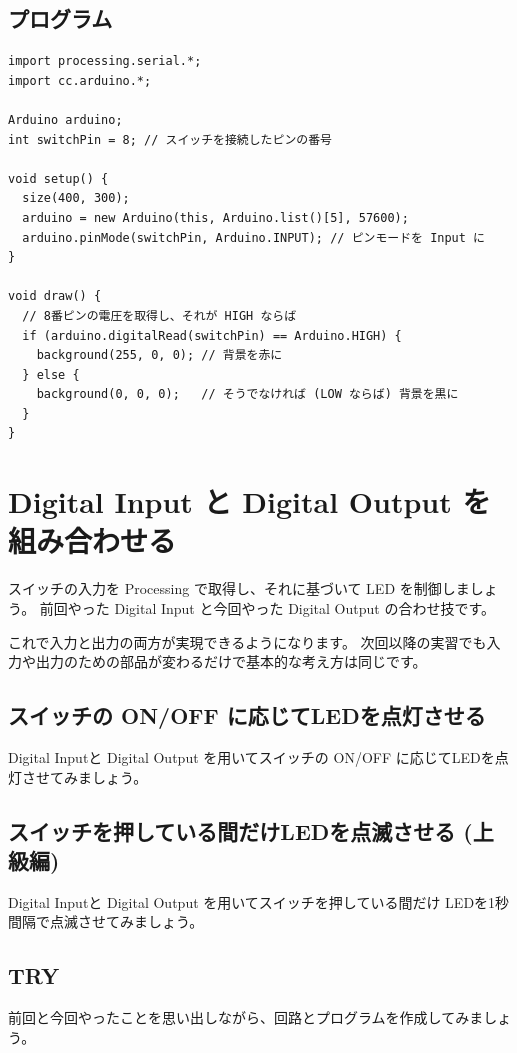 \documentclass[11pt,a4paper]{jarticle}
\begin{document}
\subsection{プログラム}
\begin{lstlisting}
import processing.serial.*;
import cc.arduino.*;

Arduino arduino;
int switchPin = 8; // スイッチを接続したピンの番号
 
void setup() {
  size(400, 300);
  arduino = new Arduino(this, Arduino.list()[5], 57600);
  arduino.pinMode(switchPin, Arduino.INPUT); // ピンモードを Input に
}
 
void draw() {
  // 8番ピンの電圧を取得し、それが HIGH ならば
  if (arduino.digitalRead(switchPin) == Arduino.HIGH) {
    background(255, 0, 0); // 背景を赤に
  } else {
    background(0, 0, 0);   // そうでなければ (LOW ならば) 背景を黒に
  }
}
\end{lstlisting}

\section{Digital Input と Digital Output を組み合わせる}
スイッチの入力を Processing で取得し、それに基づいて LED を制御しましょう。
前回やった Digital Input と今回やった Digital Output の合わせ技です。

これで入力と出力の両方が実現できるようになります。
次回以降の実習でも入力や出力のための部品が変わるだけで基本的な考え方は同じです。

\subsection{スイッチの ON/OFF に応じてLEDを点灯させる}
Digital Inputと Digital Output を用いてスイッチの ON/OFF に応じてLEDを点灯させてみましょう。

\subsection{スイッチを押している間だけLEDを点滅させる (上級編) }
Digital Inputと Digital Output を用いてスイッチを押している間だけ LEDを1秒間隔で点滅させてみましょう。

\subsection*{TRY}
前回と今回やったことを思い出しながら、回路とプログラムを作成してみましょう。
\end{document}
